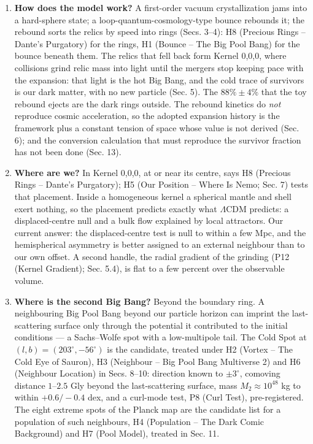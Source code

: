 \documentclass[
  11pt,
]{article}
\begin{document}
\begin{enumerate}
\def\labelenumi{\arabic{enumi}.}
\item
  \textbf{How does the model work?} A first-order vacuum crystallization
  jams into a hard-sphere state; a loop-quantum-cosmology-type bounce
  rebounds it; the rebound sorts the relics by speed into rings (Secs.
  3--4): H8 (Precious Rings -- Dante's Purgatory) for the rings, H1
  (Bounce -- The Big Pool Bang) for the bounce beneath them. The relics
  that fell back form Kernel 0,0,0, where collisions grind relic mass
  into light until the mergers stop keeping pace with the expansion:
  that light is the hot Big Bang, and the cold trace of survivors is our
  dark matter, with no new particle (Sec. 5). The \(88\% \pm 4\%\) that
  the toy rebound ejects are the dark rings outside. The rebound
  kinetics do \emph{not} reproduce cosmic acceleration, so the adopted
  expansion history is the framework plus a constant tension of space
  whose value is not derived (Sec. 6); and the conversion calculation
  that must reproduce the survivor fraction has not been done (Sec. 13).
\item
  \textbf{Where are we?} In Kernel 0,0,0, at or near its centre, says H8
  (Precious Rings -- Dante's Purgatory); H5 (Our Position -- Where Is
  Nemo; Sec. 7) tests that placement. Inside a homogeneous kernel a
  spherical mantle and shell exert nothing, so the placement predicts
  exactly what \(\Lambda\)CDM predicts: a displaced-centre null and a
  bulk flow explained by local attractors. Our current answer: the
  displaced-centre test is null to within a few Mpc, and the
  hemispherical asymmetry is better assigned to an external neighbour
  than to our own offset. A second handle, the radial gradient of the
  grinding (P12 (Kernel Gradient); Sec. 5.4), is flat to a few percent
  over the observable volume.
\item
  \textbf{Where is the second Big Bang?} Beyond the boundary ring. A
  neighbouring Big Pool Bang beyond our particle horizon can imprint the
  last-scattering surface only through the potential it contributed to
  the initial conditions --- a Sachs--Wolfe spot with a low-multipole
  tail. The Cold Spot at \((l,b) = (203^\circ, -56^\circ)\) is the
  candidate, treated under H2 (Vortex -- The Cold Eye of Sauron), H3
  (Neighbour -- Big Pool Bang Multiverse 2) and H6 (Neighbour Location)
  in Secs. 8--10: direction known to \(\pm 3^\circ\), comoving distance
  \(1\)--\(2.5\) Gly beyond the last-scattering surface, mass
  \(M_2 \approx 10^{48}\) kg to within \(+0.6/-0.4\) dex, and a
  curl-mode test, P8 (Curl Test), pre-registered. The eight extreme
  spots of the Planck map are the candidate list for a population of
  such neighbours, H4 (Population -- The Dark Comic Background) and H7
  (Pool Model), treated in Sec. 11.
\end{enumerate}
\end{document}
